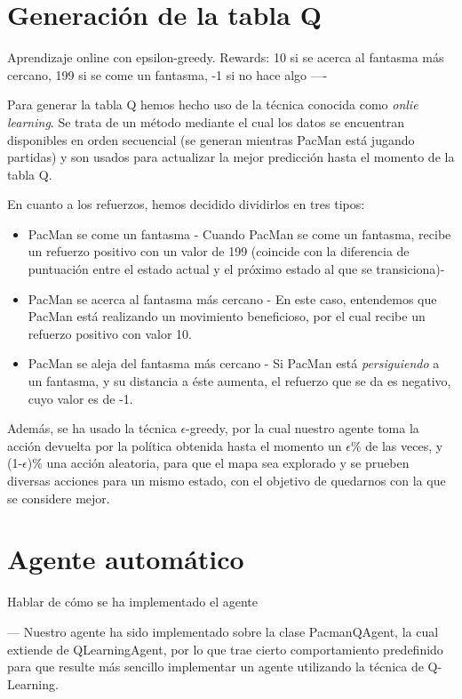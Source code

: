 \documentclass[12pt]{article}
\begin{document}
\section{Generación de la tabla Q}
Aprendizaje online con epsilon-greedy. Rewards: 10 si se acerca al fantasma más cercano, 199 si se come un fantasma, -1 si no hace algo
----

Para generar la tabla Q hemos hecho uso de la técnica conocida como \textit{onlie learning}. Se trata de un método mediante el cual los datos se encuentran disponibles en orden secuencial (se generan mientras PacMan está jugando partidas) y son usados para actualizar la mejor predicción hasta el momento de la tabla Q.

En cuanto a los refuerzos, hemos decidido dividirlos en tres tipos:
\begin{itemize}
	\item PacMan se come un fantasma - Cuando PacMan se come un fantasma, recibe un refuerzo positivo con un valor de 199 (coincide con la diferencia de puntuación entre el estado actual y el próximo estado al que se transiciona)-
	\item PacMan se acerca al fantasma más cercano - En este caso, entendemos que PacMan está realizando un movimiento beneficioso, por el cual recibe un refuerzo positivo con valor 10.
	\item PacMan se aleja del fantasma más cercano - Si PacMan está \textit{persiguiendo} a un fantasma, y su distancia a éste aumenta, el refuerzo que se da es negativo, cuyo valor es de -1.
\end{itemize}

Además, se ha usado la técnica $\epsilon$-greedy, por la cual nuestro agente toma la acción devuelta por la política obtenida hasta el momento un $\epsilon$\% de las veces, y (1-$\epsilon$)\% una acción aleatoria, para que el mapa sea explorado y se prueben diversas acciones para un mismo estado, con el objetivo de quedarnos con la que se considere mejor.

\section{Agente automático}
Hablar de cómo se ha implementado el agente

---
Nuestro agente ha sido implementado sobre la clase PacmanQAgent, la cual extiende de QLearningAgent, por lo que trae cierto comportamiento predefinido para que resulte más sencillo implementar un agente utilizando la técnica de Q-Learning.
\end{document}
